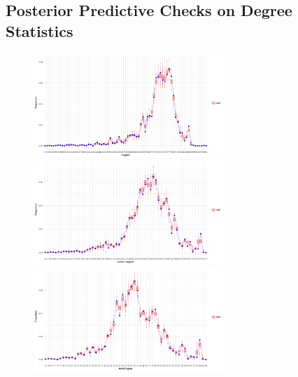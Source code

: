 \documentclass[a4paper]{article}
\begin{document}
\begin{appendices}
\section{Posterior Predictive Checks on Degree Statistics}\label{appendix: PPC}
\begin{figure}[H]
	\begin{center}
		\includegraphics[width=0.64\textwidth]{plots_paper/AMEoveralldegree-1.png}	
			\includegraphics[width=0.64\textwidth]{plots_paper/AMEoverallsecond-1.png}
				\includegraphics[width=0.64\textwidth]{plots_paper/AMEoverallthird-1.png}	
	\end{center}
\end{figure}

\end{appendices}
\end{document}
